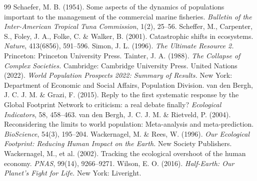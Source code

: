 \documentclass[preprint,12pt,authoryear]{elsarticle}
\begin{document}
\begin{thebibliography}{99}
 Schaefer, M. B. (1954). Some aspects of the dynamics of populations important to the management of the commercial marine fisheries. \emph{Bulletin of the Inter-American Tropical Tuna Commission}, 1(2), 25--56.
 Scheffer, M., Carpenter, S., Foley, J. A., Folke, C. \& Walker, B. (2001). Catastrophic shifts in ecosystems. \emph{Nature}, 413(6856), 591--596.
 Simon, J. L. (1996). \emph{The Ultimate Resource 2.} Princeton: Princeton University Press.
 Tainter, J. A. (1988). \emph{The Collapse of Complex Societies.} Cambridge: Cambridge University Press.
 United Nations (2022). \emph{World Population Prospects 2022: Summary of Results.} New York: Department of Economic and Social Affairs, Population Division.
 van den Bergh, J. C. J. M. \& Grazi, F. (2015). Reply to the first systematic response by the Global Footprint Network to criticism: a real debate finally? \emph{Ecological Indicators}, 58, 458--463.
 van den Bergh, J. C. J. M. \& Rietveld, P. (2004). Reconsidering the limits to world population: Meta-analysis and meta-prediction. \emph{BioScience}, 54(3), 195--204.
 Wackernagel, M. \& Rees, W. (1996). \emph{Our Ecological Footprint: Reducing Human Impact on the Earth.} New Society Publishers.
 Wackernagel, M., et al. (2002). Tracking the ecological overshoot of the human economy. \emph{PNAS}, 99(14), 9266--9271.
 Wilson, E. O. (2016). \emph{Half-Earth: Our Planet's Fight for Life.} New York: Liveright.
\end{thebibliography}
\end{document}
